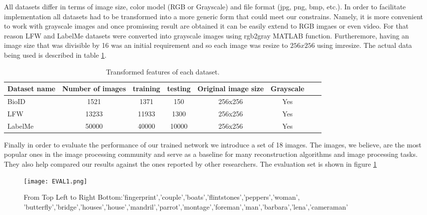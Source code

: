 All datasets differ in terms of image size, color model (RGB or Grayscale) and file format (jpg, png, bmp, etc.). In order to facilitate implementation all datasets had to be transformed into a more generic form that could meet our constrains. Namely, it is more convenient to work with grayscale images and once promissing result are obtained it can be easily extend to RGB imgaes or even video. For that reason LFW and LabelMe datasets were converted into grayscale images using rgb2gray MATLAB function. Furtheremore, having an image size that was divisible by 16 was an initial requirement and so each image was resize to $256x256$ using imresize. The actual data being used is described in table \ref{tab:datasets2}.   
\begin{table}[tb]
\caption[Transformed datasets for training and testing]{Transformed features of each dataset.}
\label{tab:datasets2}
\centering
\begin{tabular}{l*{6}{c}r}
Dataset name              & Number of images & training & testing &  Original image size& Grayscale \\
\hline
BioID   & 1521 & 1371 & 150 & 256x256 & Yes\\
LFW     & 13233 & 11933 & 1300 & 256x256 & Yes\\
LabelMe & 50000 & 40000 & 10000 & 256x256 & Yes\\
\bottomrule 
\end{tabular}  
\end{table}

Finally in order to evaluate the performance of our trained network we introduce a set of 18 images. The images, we believe, are the most popular ones in the image processing community and serve as a baseline for many reconstruction algorithms and image processing tasks. They also help compared our results against the ones reported by other researchers. The evaluation set is shown in figure \ref{fig:EVALim1}
\begin{figure}[tb] 
\centering 
\texttt{[image: EVAL1.png]} 
\caption[Evaluation images]{From Top Left to Right Bottom:'fingerprint','couple','boats','flintstones','peppers','woman',
'butterfly','bridge','houses','house','mandril','parrot','montage','foreman','man','barbara','lena','cameraman'}
\label{fig:EVALim1} 
\end{figure}